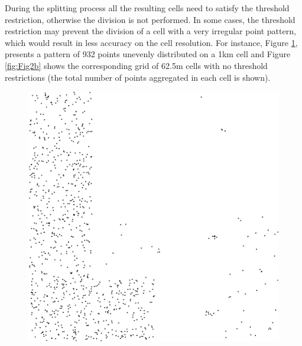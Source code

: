 During the splitting process all the resulting cells need to satisfy the threshold restriction, otherwise the division is not performed. In some cases, the threshold restriction may prevent the division of a cell with a very irregular point pattern, which would result in less accuracy on the cell resolution. For instance, Figure \ref{fig:Fig2a}, presents a pattern of 932 points unevenly distributed on a 1km cell and Figure \ref{fig:Fig2b} shows the corresponding grid of 62.5m cells with no threshold restrictions (the total number of points aggregated in each cell is shown).
\begin{figure}[ht!]
  \centering
  \begin{minipage}[b]{0.3\linewidth}
    \includegraphics[width=\linewidth]{images/Fig2a.png}
    \subcaption{ }\label{fig:Fig2a}
  \end{minipage}
  \begin{minipage}[b]{0.3\linewidth}

\end{minipage}
\end{figure}
